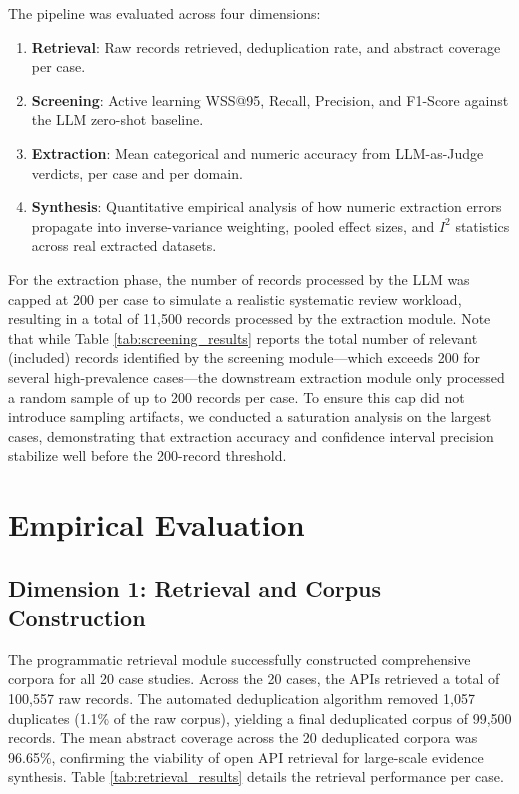 \documentclass[12pt]{article}
\begin{document}
The pipeline was evaluated across four dimensions:
\begin{enumerate}
    \item \textbf{Retrieval}: Raw records retrieved, deduplication rate, and abstract coverage per case.
    \item \textbf{Screening}: Active learning WSS@95, Recall, Precision, and F1-Score against the LLM zero-shot baseline.
    \item \textbf{Extraction}: Mean categorical and numeric accuracy from LLM-as-Judge verdicts, per case and per domain.
    \item \textbf{Synthesis}: Quantitative empirical analysis of how numeric extraction errors propagate into inverse-variance weighting, pooled effect sizes, and $I^2$ statistics across real extracted datasets.
\end{enumerate}

For the extraction phase, the number of records processed by the LLM was capped at 200 per case to simulate a realistic systematic review workload, resulting in a total of 11,500 records processed by the extraction module. Note that while Table \ref{tab:screening_results} reports the total number of relevant (included) records identified by the screening module---which exceeds 200 for several high-prevalence cases---the downstream extraction module only processed a random sample of up to 200 records per case. To ensure this cap did not introduce sampling artifacts, we conducted a saturation analysis on the largest cases, demonstrating that extraction accuracy and confidence interval precision stabilize well before the 200-record threshold.

\section{Empirical Evaluation}

\subsection{Dimension 1: Retrieval and Corpus Construction}

The programmatic retrieval module successfully constructed comprehensive corpora for all 20 case studies. Across the 20 cases, the APIs retrieved a total of 100,557 raw records. The automated deduplication algorithm removed 1,057 duplicates (1.1\% of the raw corpus), yielding a final deduplicated corpus of 99,500 records. The mean abstract coverage across the 20 deduplicated corpora was 96.65\%, confirming the viability of open API retrieval for large-scale evidence synthesis. Table \ref{tab:retrieval_results} details the retrieval performance per case.
\end{document}
